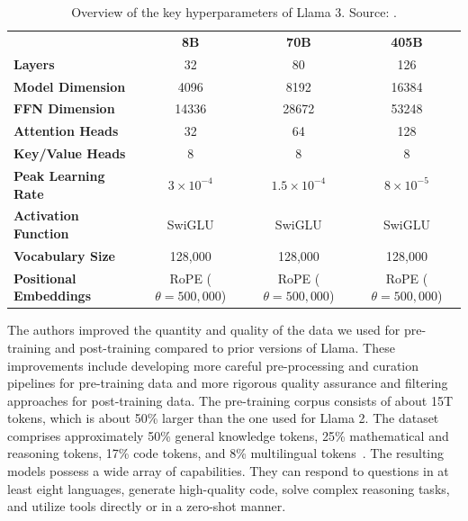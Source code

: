 \begin{table}[h!]
	\centering
	\begin{tabularx}{\textwidth}{Xccc}
		\textbf{}                      & \textbf{8B}               & \textbf{70B}              & \textbf{405B}             \\
		\textbf{Layers}                & 32                        & 80                        & 126                       \\
		\textbf{Model Dimension}       & 4096                      & 8192                      & 16384                     \\
		\textbf{FFN Dimension}         & 14336                     & 28672                     & 53248                     \\
		\textbf{Attention Heads}       & 32                        & 64                        & 128                       \\
		\textbf{Key/Value Heads}       & 8                         & 8                         & 8                         \\
		\textbf{Peak Learning Rate}    & $3 \times 10^{-4}$        & $1.5 \times 10^{-4}$      & $8 \times 10^{-5}$        \\
		\textbf{Activation Function}   & SwiGLU                    & SwiGLU                    & SwiGLU                    \\
		\textbf{Vocabulary Size}       & 128,000                   & 128,000                   & 128,000                   \\
		\textbf{Positional Embeddings} & RoPE ($\theta = 500,000$) & RoPE ($\theta = 500,000$) & RoPE ($\theta = 500,000$) \\
		\hline
	\end{tabularx}
	\caption{Overview of the key hyperparameters of Llama 3. Source: \textcite{llama3}.}
	\label{tab:llama3-hyperparameters}
\end{table}

The authors improved the quantity and quality of the data we used for pre-training and post-training compared to prior versions of Llama.
These improvements include developing more careful pre-processing and curation pipelines for pre-training data and more rigorous quality assurance and filtering approaches for post-training data.
The pre-training corpus consists of about 15T tokens, which is about 50\% larger than the one used for Llama 2.
The dataset comprises approximately 50\% general knowledge tokens, 25\% mathematical and reasoning tokens, 17\% code tokens, and 8\% multilingual tokens~\cite{llama3}.
The resulting models possess a wide array of capabilities.
They can respond to questions in at least eight languages, generate high-quality code, solve complex reasoning tasks, and utilize tools directly or in a zero-shot manner.


